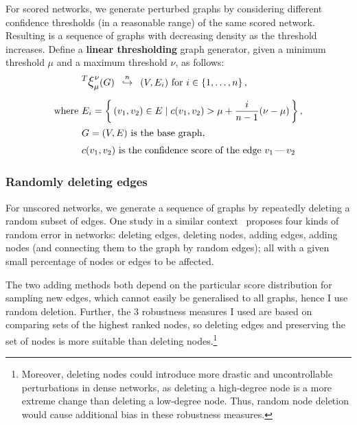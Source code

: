 For scored networks, we generate perturbed graphs by considering different confidence thresholds (in a reasonable range) of the same scored network.
Resulting is a sequence of graphs with decreasing density as the threshold increases.
Define a \textbf{linear thresholding} graph generator, given a minimum threshold $\mu$ and a maximum threshold $\nu$, as follows:
\begin{align}
    &\mathlarger{^T \mathlarger{\xi}}_{\mu}^{\nu}(G) \generates{n} (V, E_i)~\text{for}~i\in \integersto{n}, \\[6pt]
    \text{where}~& E_i = \Set{(v_1, v_2)\in E}{ c(v_1, v_2) > \mu + \frac{i}{n - 1}(\nu - \mu) }, \nonumber \\
    &G = (V, E)~\text{is the base graph}, \nonumber \\
    &c(v_1, v_2)~\text{is the confidence score of the edge $v_1\,\text{---}\,v_2$} \nonumber
\end{align}



\subsubsection*{Randomly deleting edges}\label{sec:randomly_removing_edges}

For unscored networks, we generate a sequence of graphs by repeatedly deleting a random subset of edges.
One study in a similar context~\cite{BorgattiRobustnessCentralityMeasures2006} proposes four kinds of random error in networks: deleting edges, deleting nodes, adding edges, adding nodes (and connecting them to the graph by random edges); all with a given small percentage of nodes or edges to be affected.

The two adding methods both depend on the particular score distribution for sampling new edges, which cannot easily be generalised to all graphs, hence I use random deletion.
Further, the 3 robustness measures I used are based on comparing sets of the highest ranked nodes, so deleting edges and preserving the set of nodes is more suitable than deleting nodes.\footnote{Moreover, deleting nodes could introduce more drastic and uncontrollable perturbations in dense networks, as deleting a high-degree node is a more extreme change than deleting a low-degree node. Thus, random node deletion would cause additional bias in these robustness measures.}

